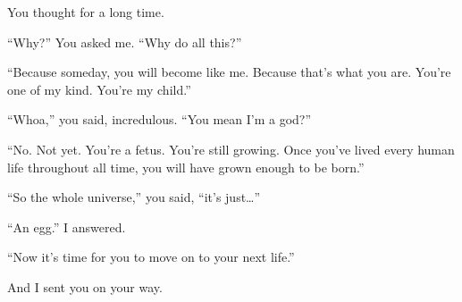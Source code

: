 You thought for a long time.

\enquote{Why?} You asked me. \enquote{Why do all this?}

\enquote{Because someday, you will become like me. Because that's what you are. You're one of my kind. You're my child.}

\enquote{Whoa,} you said, incredulous. \enquote{You mean I'm a god?}

\enquote{No. Not yet. You're a fetus. You're still growing. Once you've lived every human life throughout all time, you will have grown enough to be born.}

\enquote{So the whole universe,} you said, \enquote{it's just\ldots{}}

\enquote{An egg.} I answered. 

\enquote{Now it's time for you to move on to your next life.}

And I sent you on your way.
